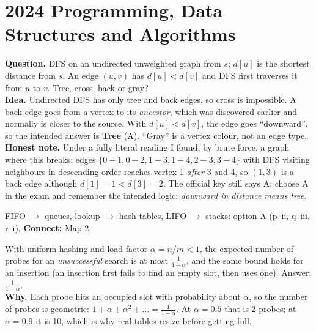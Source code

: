 \documentclass[11pt,a4paper]{article}
\begin{document}
\section{2024 Programming, Data Structures and Algorithms}

\begin{example}
\textbf{Question.} DFS on an undirected unweighted graph from $s$; $d[u]$ is the shortest distance from $s$. An edge $(u,v)$ has $d[u]<d[v]$ and DFS first traverses it from $u$ to $v$. Tree, cross, back or gray?\\
\textbf{Idea.} Undirected DFS has only tree and back edges, so cross is impossible. A back edge goes from a vertex to its \emph{ancestor}, which was discovered earlier and normally is closer to the source. With $d[u]<d[v]$, the edge goes ``downward'', so the intended answer is \textbf{Tree} (A). ``Gray'' is a vertex colour, not an edge type.\\
\textbf{Honest note.} Under a fully literal reading I found, by brute force, a graph where this breaks: edges $\{0\!-\!1,0\!-\!2,1\!-\!3,1\!-\!4,2\!-\!3,3\!-\!4\}$ with DFS visiting neighbours in descending order reaches vertex 1 \emph{after} 3 and 4, so $(1,3)$ is a back edge although $d[1]=1<d[3]=2$. The official key still says A; choose A in the exam and remember the intended logic: \emph{downward in distance means tree}.
\end{example}

\begin{example}
FIFO $\to$ queues, lookup $\to$ hash tables, LIFO $\to$ stacks: option A (p--ii, q--iii, r--i). \textbf{Connect:} Map 2.
\end{example}

\begin{example}
With uniform hashing and load factor $\alpha=n/m<1$, the expected number of probes for an \emph{unsuccessful} search is at most $\frac1{1-\alpha}$, and the same bound holds for an insertion (an insertion first fails to find an empty slot, then uses one). Answer: $\frac1{1-\alpha}$.\\
\textbf{Why.} Each probe hits an occupied slot with probability about $\alpha$, so the number of probes is geometric: $1+\alpha+\alpha^2+\dots=\frac1{1-\alpha}$. At $\alpha=0.5$ that is 2 probes; at $\alpha=0.9$ it is 10, which is why real tables resize before getting full.
\end{example}
\end{document}

